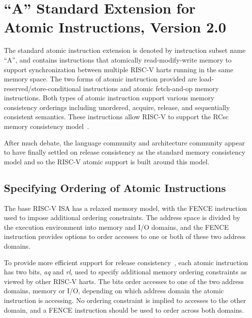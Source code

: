 \chapter{``A'' Standard Extension for Atomic Instructions, Version 2.0}
\label{atomics}

The standard atomic instruction extension is denoted by instruction
subset name ``A'', and contains instructions that atomically
read-modify-write memory to support synchronization between multiple
RISC-V harts running in the same memory space.  The two forms of
atomic instruction provided are load-reserved/store-conditional
instructions and atomic fetch-and-op memory instructions.  Both types
of atomic instruction support various memory consistency orderings
including unordered, acquire, release, and sequentially consistent
semantics.  These instructions allow RISC-V to support the RCsc memory
consistency model~\cite{Gharachorloo90memoryconsistency}.

\begin{commentary}
After much debate, the language community and architecture community
appear to have finally settled on release consistency as the standard
memory consistency model and so the RISC-V atomic support is built
around this model.
\end{commentary}

\section{Specifying Ordering of Atomic Instructions}

The base RISC-V ISA has a relaxed memory model, with the FENCE
instruction used to impose additional ordering constraints.  The
address space is divided by the execution environment into memory and
I/O domains, and the FENCE instruction provides options to order
accesses to one or both of these two address domains.

To provide more efficient support for release
consistency~\cite{Gharachorloo90memoryconsistency}, each atomic
instruction has two bits, {\em aq} and {\em rl}, used to specify
additional memory ordering constraints as viewed by other RISC-V
harts.  The bits order accesses to one of the two address domains,
memory or I/O, depending on which address domain the atomic
instruction is accessing.  No ordering constraint is implied to
accesses to the other domain, and a FENCE instruction should be used
to order across both domains.

